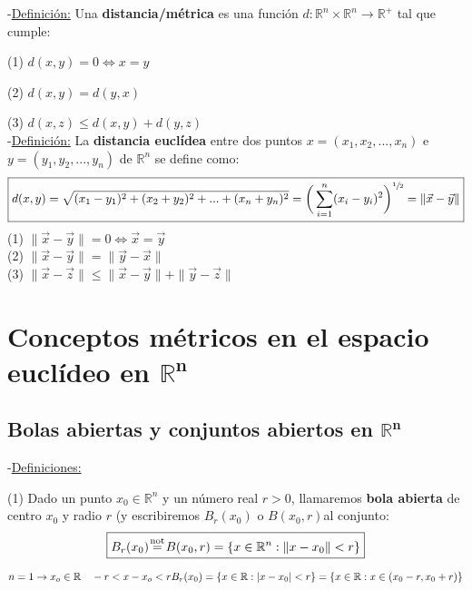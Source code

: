 \documentclass[12pt, titlepage]{article}
\newcommand{\eqc}[1]{\stackrel{\mathclap{\normalfont\mbox{\scriptsize{#1}}}}{=}}
\begin{document}
\noindent-\underline{Definición:} Una \textbf{distancia/métrica} es una función $d:\mathbb{R}^n \times \mathbb{R}^n \rightarrow \mathbb{R}^+$ tal que cumple: \vspace{2mm}

(1) $ d(x, y) = 0 \iff x=y$ \vspace{1mm}

(2) $ d(x, y) = d(y, x)$ \vspace{1mm}

(3) $d(x, z) \leq d(x, y) + d(y, z)$ \\

\noindent-\underline{Definición:} La \textbf{distancia euclídea} entre dos puntos $x = (x_1, x_2,..., x_n)$ e $y = (y_1, y_2,..., y_n)$ de $\mathbb{R}^n$ se define como:
$$\boxed{d(x, y) = \sqrt{(x_1-y_1)^2+(x_2+y_2)^2+...+(x_n+y_n)^2}=\bigg{(} \sum_{i=1}^n (x_i - y_i)^2 \bigg{)}^{\sfrac{1}{2}} = \|\vec{x} - \vec{y}\|}$$\break
(1) $\|\vec{x} - \vec{y}\| = 0 \iff \vec{x} = \vec{y}$\\
(2) $\|\vec{x} - \vec{y}\| = \|\vec{y} - \vec{x}\|$ \\
(3) $\|\vec{x} - \vec{z}\| \leq \|\vec{x} - \vec{y}\| + \|\vec{y} - \vec{z}\|$


\section{Conceptos métricos en el espacio euclídeo en $\mathbb{R}^{\mathbf{n}}$}
\vspace{3mm}


\subsection{Bolas abiertas y conjuntos abiertos en $\mathbb{R}^{\mathbf{n}}$}
\vspace{3mm}

-\underline{Definiciones:}

\vspace{5mm}
\noindent
(1) Dado un punto $x_0 \in \mathbb{R}^n$ y un número real $r>0$, llamaremos \textbf{bola abierta} de centro $x_0$ y radio $r$ (y escribiremos $B_r (x_0) $ o $B(x_0, r)$al conjunto:
$$\boxed{B_r (x_0)  \eqc{not} B(x_0, r) = \{ x \in \mathbb{R}^n : \|x-x_0\|<r\}}$$
\vspace{1mm}

\noindent
$n=1 \rightarrow x_o \in \mathbb{R} \quad -r<x-x_o<r \\ B_r(x_0) = \{ x \in \mathbb{R} : |x-x_0|<r\} = \{ x \in \mathbb{R} : x \in (x_0-r, x_0+r) \}$
\end{document}
